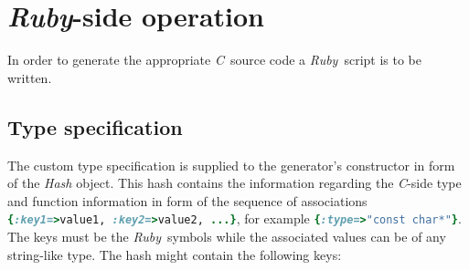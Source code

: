 \documentclass[a4paper]{article}
\newcommand{\R}{\emph{Ruby}}
\newcommand{\C}{\emph{C}}
\begin{document}
\section{\R-side operation}


In order to generate the appropriate \C\ source code a \R\ script is to be written.


\subsection{Type specification}


The custom type specification is supplied to the generator's constructor in form of the \emph{Hash} object.
This hash contains the information regarding the \C-side type and function information in form of the sequence of associations \lstinline[language=Ruby]!{:key1=>value1, :key2=>value2, ...}!, for example \lstinline[language=Ruby]!{:type=>"const char*"}!. The keys must be the \R\ symbols while the associated values can be of any string-like type.
The hash might contain the following keys:
\end{document}
